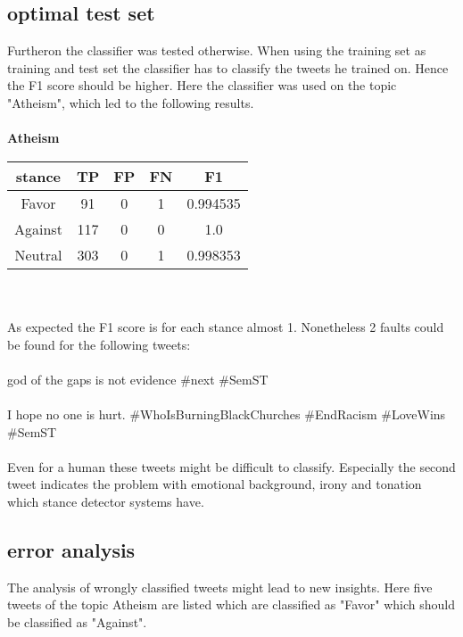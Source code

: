 \documentclass[a4paper,12pt,twoside]{article}
\begin{document}
\subsection{optimal test set}
Furtheron the classifier was tested otherwise. When using the training set as training and test set the classifier has to classify the tweets he trained on. Hence the F1 score should be higher.
Here the classifier was used on the topic "Atheism", which led to the following results. \\
\\
\textbf{Atheism}
\\
\begin{tabular}{c|ccc|c}
stance & TP & FP & FN & F1\\ \hline
Favor & 91 & 0 & 1 & 0.994535\\
Against & 117 & 0 & 0 & 1.0\\
Neutral &  303 & 0 & 1 & 0.998353\\
\end{tabular}\\
\\
As expected the F1 score is for each stance almost 1. Nonetheless 2 faults could be found for the following tweets:\\
\\
god of the gaps is not evidence \#next \#SemST\\
\\
I hope no one is hurt. \#WhoIsBurningBlackChurches \#EndRacism \#LoveWins \#SemST\\
\\
Even for a human these tweets might be difficult to classify. Especially the second tweet indicates the problem with emotional background, irony and tonation which stance detector systems have. 

\subsection{error analysis}

The analysis of wrongly classified tweets might lead to new insights.
Here five tweets of the topic Atheism are listed which are classified as "Favor" which should be classified as "Against". 
\end{document}
